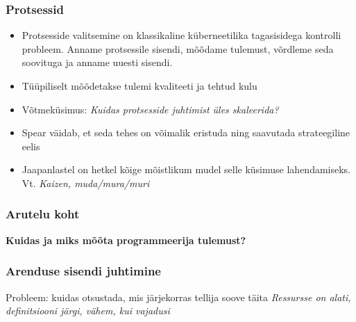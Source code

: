 \begin{frame}[fragile]
  \frametitle{Protsessid}
	\begin{itemize}
		\item Protsesside valitsemine on klassikaline küberneetilika tagasisidega kontrolli probleem. Anname protsessile sisendi, mõõdame tulemust, võrdleme seda soovituga ja anname uuesti sisendi. 
		\item Tüüpiliselt mõõdetakse tulemi kvaliteeti ja tehtud kulu
		\item Võtmeküsimus: \emph{Kuidas protsesside juhtimist üles skaleerida?}
		\item Spear \citep{spear2010high} väidab, et seda tehes on võimalik eristuda ning saavutada strateegiline eelis
		\item Jaapanlastel on hetkel kõige mõistlikum mudel selle küsimuse lahendamiseks. Vt. \emph{Kaizen, muda/mura/muri}
	\end{itemize}
\end{frame}


\begin{frame}[fragile]
  \frametitle{Arutelu koht}
		\begin{center}
			\textbf{Kuidas ja miks mõõta programmeerija tulemust?}
		\end{center}
\end{frame}

\begin{frame}[fragile]
  \frametitle{Arenduse sisendi juhtimine}
  \begin{center}
	  Probleem: kuidas otsustada, mis järjekorras tellija soove täita
\bigskip
	\emph{  Ressursse on alati, definitsiooni järgi, vähem, kui vajadusi}
  \end{center}
\end{frame}
    
